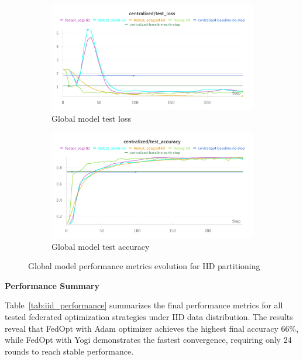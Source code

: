 \documentclass[11pt]{article}
\begin{document}
    \begin{figure}[h]
        \centering
        \begin{subfigure}[b]{0.48\textwidth}
            \centering
            \includegraphics[width=\textwidth]{img/experiment_1/iid_server_test_loss}
            \caption{Global model test loss}
            \label{fig:iid_global_val_loss}
        \end{subfigure}
        \hfill
        \begin{subfigure}[b]{0.48\textwidth}
            \centering
            \includegraphics[width=\textwidth]{img/experiment_1/iid_server_test_acc}
            \caption{Global model test accuracy}
            \label{fig:iid_global_val_acc}
        \end{subfigure}
        \caption{Global model performance metrics evolution for IID partitioning}
        \label{fig:iid_global_metrics}
    \end{figure}

    \textbf{Performance Summary}

    Table~\ref{tab:iid_performance} summarizes the final performance metrics for all tested federated optimization strategies under IID data distribution. The results reveal that FedOpt with Adam optimizer achieves the highest final accuracy 66\%, while FedOpt with Yogi demonstrates the fastest convergence, requiring only 24 rounds to reach stable performance.
\end{document}
